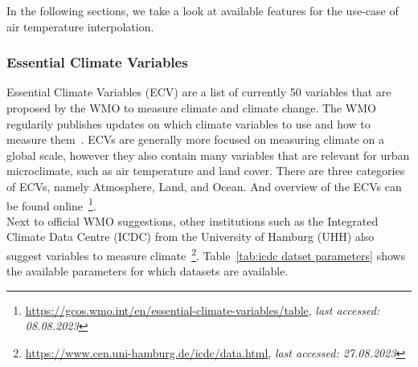 In the following sections, we take a look at available features for the use-case of air temperature interpolation.

\subsubsection{Essential Climate Variables}

Essential Climate Variables (ECV) are a list of currently 50 variables that are proposed by the WMO to measure climate and climate change. The WMO regularily publishes updates on which climate variables to use and how to measure them~\cite{wmo2018guide}. ECVs are generally more focused on measuring climate on a global scale, however they also contain many variables that are relevant for urban microclimate, such as air temperature and land cover. There are three categories of ECVs, namely Atmosphere, Land, and Ocean. And overview of the ECVs can be found online~\footnote{\url{https://gcos.wmo.int/en/essential-climate-variables/table}, \textit{last accessed: 08.08.2023}}.\\
Next to official WMO suggestions, other institutions such as the Integrated Climate Data Centre (ICDC) from the University of Hamburg (UHH) also suggest variables to measure climate~\footnote{\url{https://www.cen.uni-hamburg.de/icdc/data.html}, \textit{last accessed: 27.08.2023}}. Table~\ref{tab:icdc datset parameters} shows the available parameters for which datasets are available.

